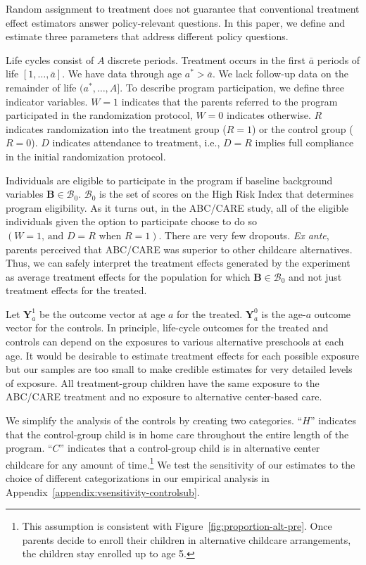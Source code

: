 Random assignment to treatment does not guarantee that conventional treatment effect estimators answer policy-relevant questions. In this paper, we define and estimate three parameters that address different policy questions.

Life cycles consist of $A$ discrete periods. Treatment occurs in the first $\bar{a}$ periods of life $\left[1,\dots,\bar{a}\right]$. We have data through age $a^{*}>\bar{a}$. We lack follow-up data on the remainder of life $(a^*,\dots,A]$. To describe program participation, we define three indicator variables. $W = 1$ indicates that the parents referred to the program participated in the randomization protocol, $W = 0$ indicates otherwise. $R$ indicates randomization into the treatment group ($R = 1$) or the control group ($R = 0$). $D$ indicates attendance to treatment, i.e., $D = R$ implies full compliance in the initial randomization protocol.

Individuals are eligible to participate in the program if baseline background variables $\bm{B}\in\mathcal{B}_0$. $\mathcal{B}_0$ is the set of scores on the High Risk Index that determines program eligibility. As it turns out, in the ABC/CARE study, all of the eligible individuals given the option to participate choose to do so $(W=1\text{, and } D=R \text{ when } R=1)$. There are very few dropouts. \emph{Ex ante}, parents perceived that ABC/CARE was superior to other childcare alternatives. Thus, we can safely interpret the treatment effects generated by the experiment as average treatment effects for the population for which $\bm{B}\in\mathcal{B}_0$ and not just treatment effects for the treated.

Let $\bm{Y}^1_a$ be the outcome vector at age $a$ for the treated. $\bm{Y}^0_a$ is the age-$a$ outcome vector for the controls. In principle, life-cycle outcomes for the treated and controls can depend on the exposures to various alternative preschools at each age. It would be desirable to estimate treatment effects for each possible exposure but our samples are too small to make credible estimates for very detailed levels of exposure. All treatment-group children have the same exposure to the ABC/CARE treatment and no exposure to alternative center-based care. 

We simplify the analysis of the controls by creating two categories. ``$H$'' indicates that the control-group child is in home care throughout the entire length of the program. ``$C$'' indicates that a control-group child is in alternative center childcare for any amount of time.\footnote{This assumption is consistent with Figure~\ref{fig:proportion-alt-pre}. Once parents decide to enroll their children in alternative childcare arrangements, the children stay enrolled up to age 5.} We test the sensitivity of our estimates to the choice of different categorizations in our empirical analysis in Appendix~\ref{appendix:vsensitivity-controlsub}.

